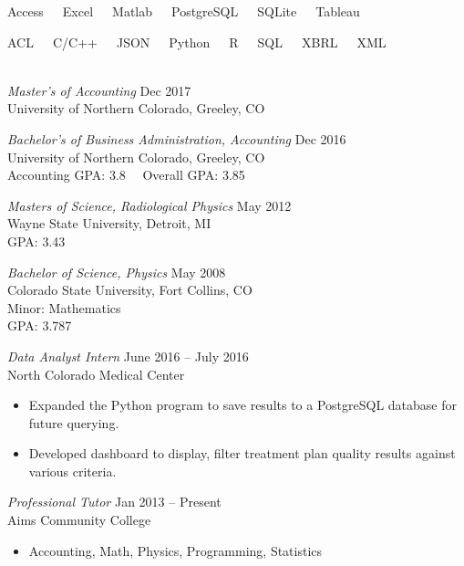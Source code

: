 \documentclass[11pt]{article}
\begin{document}
\begin{description}[leftmargin=!,labelwidth=2cm,align=right]
\item[Tools]
    Access\ \ \ Excel\ \ \ Matlab\ \ \ PostgreSQL\ \ \ SQLite\ \ \ Tableau

\item[Languages]
    ACL\ \ \ C/C++\ \ \ JSON\ \ \ Python\ \ \ R\ \ \ SQL\ \ \ XBRL\ \ \ XML\\\

\item[Education]
    {\sl Master's of Accounting} \hfill Dec 2017\\
    University of Northern Colorado, Greeley, CO

    {\sl Bachelor's of Business Administration, Accounting} \hfill Dec 2016\\
    University of Northern Colorado, Greeley, CO\\
    Accounting GPA: 3.8 \qquad\ \  Overall GPA: 3.85

    {\sl Masters of Science, Radiological Physics} \hfill May 2012\\
    Wayne State University, Detroit, MI\\
    GPA: 3.43

    {\sl Bachelor of Science, Physics} \hfill May 2008\\
    Colorado State University, Fort Collins, CO \\
    Minor: Mathematics\\
    GPA: 3.787

\item[Experience]
    {\sl Data Analyst Intern} \hfill June 2016 -- July 2016\\North Colorado Medical Center
    \begin{itemize}[rightmargin=2cm,noitemsep]
        \item Expanded the Python program to save results to a PostgreSQL database for future querying.
        \item Developed dashboard to display, filter treatment plan quality results against various criteria.
    \end{itemize}

    {\sl Professional Tutor} \hfill Jan 2013 -- Present\\Aims Community College
    \begin{itemize}[rightmargin=2cm,noitemsep]
        \item Accounting, Math, Physics, Programming, Statistics
    \end{itemize}


\end{description}
\end{document}
